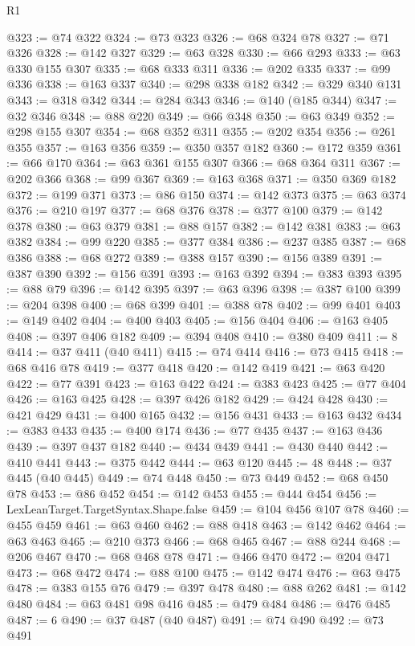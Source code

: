 \begin{lexlean}{R1}
\begin{coremodule}
@323 := @74 @322
@324 := @73 @323
@326 := @68 @324 @78
@327 := @71 @326
@328 := @142 @327
@329 := @63 @328
@330 := @66 @293
@333 := @63 @330 @155 @307
@335 := @68 @333 @311
@336 := @202 @335
@337 := @99 @336
@338 := @163 @337
@340 := @298 @338 @182
@342 := @329 @340 @131
@343 := @318 @342
@344 := @284 @343
@346 := @140 (@185 @344)
@347 := @32 @346
@348 := @88 @220
@349 := @66 @348
@350 := @63 @349
@352 := @298 @155 @307
@354 := @68 @352 @311
@355 := @202 @354
@356 := @261 @355
@357 := @163 @356
@359 := @350 @357 @182
@360 := @172 @359
@361 := @66 @170
@364 := @63 @361 @155 @307
@366 := @68 @364 @311
@367 := @202 @366
@368 := @99 @367
@369 := @163 @368
@371 := @350 @369 @182
@372 := @199 @371
@373 := @86 @150
@374 := @142 @373
@375 := @63 @374
@376 := @210 @197
@377 := @68 @376
@378 := @377 @100
@379 := @142 @378
@380 := @63 @379
@381 := @88 @157
@382 := @142 @381
@383 := @63 @382
@384 := @99 @220
@385 := @377 @384
@386 := @237 @385
@387 := @68 @386
@388 := @68 @272
@389 := @388 @157
@390 := @156 @389
@391 := @387 @390
@392 := @156 @391
@393 := @163 @392
@394 := @383 @393
@395 := @88 @79
@396 := @142 @395
@397 := @63 @396
@398 := @387 @100
@399 := @204 @398
@400 := @68 @399
@401 := @388 @78
@402 := @99 @401
@403 := @149 @402
@404 := @400 @403
@405 := @156 @404
@406 := @163 @405
@408 := @397 @406 @182
@409 := @394 @408
@410 := @380 @409
@411 := 8
@414 := @37 @411 (@40 @411)
@415 := @74 @414
@416 := @73 @415
@418 := @68 @416 @78
@419 := @377 @418
@420 := @142 @419
@421 := @63 @420
@422 := @77 @391
@423 := @163 @422
@424 := @383 @423
@425 := @77 @404
@426 := @163 @425
@428 := @397 @426 @182
@429 := @424 @428
@430 := @421 @429
@431 := @400 @165
@432 := @156 @431
@433 := @163 @432
@434 := @383 @433
@435 := @400 @174
@436 := @77 @435
@437 := @163 @436
@439 := @397 @437 @182
@440 := @434 @439
@441 := @430 @440
@442 := @410 @441
@443 := @375 @442
@444 := @63 @120
@445 := 48
@448 := @37 @445 (@40 @445)
@449 := @74 @448
@450 := @73 @449
@452 := @68 @450 @78
@453 := @86 @452
@454 := @142 @453
@455 := @444 @454
@456 := LexLeanTarget.TargetSyntax.Shape.false
@459 := @104 @456 @107 @78
@460 := @455 @459
@461 := @63 @460
@462 := @88 @418
@463 := @142 @462
@464 := @63 @463
@465 := @210 @373
@466 := @68 @465
@467 := @88 @244
@468 := @206 @467
@470 := @68 @468 @78
@471 := @466 @470
@472 := @204 @471
@473 := @68 @472
@474 := @88 @100
@475 := @142 @474
@476 := @63 @475
@478 := @383 @155 @76
@479 := @397 @478
@480 := @88 @262
@481 := @142 @480
@484 := @63 @481 @98 @416
@485 := @479 @484
@486 := @476 @485
@487 := 6
@490 := @37 @487 (@40 @487)
@491 := @74 @490
@492 := @73 @491

\end{coremodule}
\end{lexlean}
